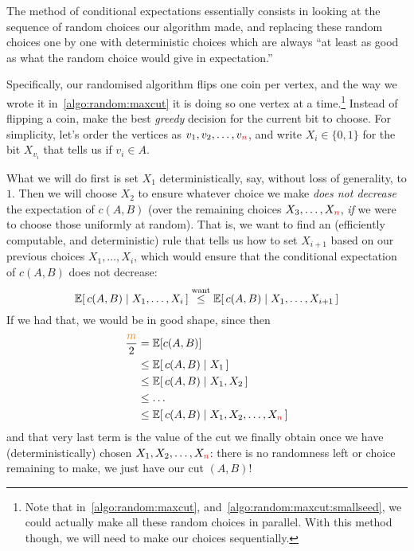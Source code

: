 The method of conditional expectations essentially consists in looking at the sequence of random choices our algorithm made, and replacing these random choices one by one with deterministic choices which are always ``at least as good as what the random choice would give in expectation.''

Specifically, our randomised algorithm flips one coin per vertex, and the way we wrote it in~\cref{algo:random:maxcut} it is doing so one vertex at a time.\footnote{Note that in~\cref{algo:random:maxcut}, and~\cref{algo:random:maxcut:smallseed}, we could actually make all these random choices in parallel. With this method though, we will need to make our choices sequentially.} Instead of flipping a coin, make the best \emph{greedy} decision for the current bit to choose. For simplicity, let's order the vertices as $v_1, v_2, \dots, v_{\textcolor{red}{n}}$, and write $X_i \in \{0,1\}$ for the bit $X_{v_i}$ that tells us if $v_i \in A$.

What we will do first is set $X_1$ deterministically, say, without loss of generality, to $1$. Then we will choose $X_2$ to ensure whatever choice we make \emph{does not decrease} the expectation of $c(A,B)$ (over the remaining choices $X_3,\dots, X_{\textcolor{red}{n}}$, \emph{if} we were to choose those uniformly at random). That is, we want to find an (efficiently computable, and deterministic) rule that tells us how to set $X_{i+1}$ based on our previous choices $X_1,\dots, X_i$, which would ensure that the conditional expectation of $c(A,B)$ does not decrease:
\begin{equation}
    \label{eq:method:conditional:expectations}
	\expectCond{c(A,B) }{X_1,\dots, X_i} \stackrel{\rm want}{\leq} \expectCond{c(A,B) }{X_1,\dots, X_{i+1}}
\end{equation}
If we had that, we would be in good shape, since then
\begin{align*}
	\frac{\orange{m}}{2} &= \expect{c(A,B) } \\
    &\leq \expectCond{c(A,B) }{X_1}  \\
    &\leq \expectCond{c(A,B) }{X_1,X_2}  \\
    &\leq \dots  \\
    &\leq \expectCond{c(A,B) }{X_1,X_2,\dots, X_{\red{n}}} 
\end{align*}
and that very last term is the value of the cut we finally obtain once we have (deterministically) chosen $X_1,X_2,\dots, X_{\textcolor{red}{n}}$: there is no randomness left or choice remaining to make, we just have our cut $(A,B)$!

